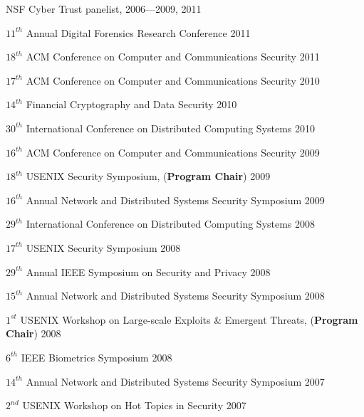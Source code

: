 \documentclass[11pt]{article}
\begin{document}
\begin{itemize}
{\item NSF Cyber Trust panelist, 2006---2009, \hfill 2011

\item $11^{th}$ Annual Digital Forensics Research Conference \hfill 2011

\item $18^{th}$ ACM Conference on Computer and Communications Security \hfill 2011

\item $17^{th}$ ACM Conference on Computer and Communications Security \hfill 2010

\item $14^{th}$ Financial Cryptography and Data Security \hfill 2010

\item $30^{th}$ International Conference on Distributed Computing
 Systems \hfill 2010

\item $16^{th}$ ACM Conference on Computer and Communications Security \hfill 2009

\item $18^{th}$ {USENIX} Security Symposium, ({\bf Program Chair}) \hfill 2009

\item $16^{th}$ Annual Network and Distributed Systems Security
 Symposium \hfill 2009

\item $29^{th}$ International Conference on Distributed Computing
 Systems \hfill 2008

\item $17^{th}$ {USENIX} Security Symposium \hfill 2008

\item $29^{th}$ Annual IEEE Symposium on Security and Privacy \hfill 2008

\item $15^{th}$ Annual Network and Distributed Systems Security
 Symposium \hfill 2008

\item $1^{st}$ USENIX Workshop on Large-scale Exploits \& Emergent
 Threats, ({\bf Program Chair}) \hfill 2008

\item $6^{th}$ IEEE Biometrics Symposium \hfill 2008

\item $14^{th}$ Annual Network and Distributed Systems Security
 Symposium \hfill 2007

\item $2^{nd}$ USENIX Workshop on Hot Topics in Security \hfill 2007

}
\end{itemize}
\end{document}
